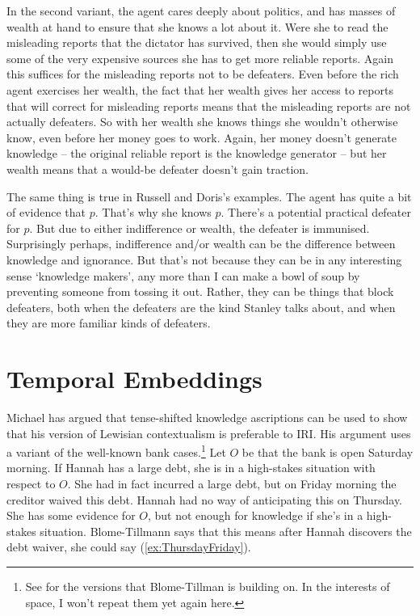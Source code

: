 \documentclass[11pt,oneside]{book}
\begin{document}
In the second variant, the agent cares deeply about politics, and has masses of wealth at hand to ensure that she knows a lot about it. Were she to read the misleading reports that the dictator has survived, then she would simply use some of the very expensive sources she has to get more reliable reports. Again this suffices for the misleading reports not to be defeaters. Even before the rich agent exercises her wealth, the fact that her wealth gives her access to reports that will correct for misleading reports means that the misleading reports are not actually defeaters. So with her wealth she knows things she wouldn't otherwise know, even before her money goes to work. Again, her money doesn't generate knowledge -- the original reliable report is the knowledge generator -- but her wealth means that a would-be defeater doesn't gain traction.

The same thing is true in Russell and Doris's examples. The agent has quite a bit of evidence that \(p\). That's why she knows \(p\). There's a potential practical defeater for \(p\). But due to either indifference or wealth, the defeater is immunised. Surprisingly perhaps, indifference and/or wealth can be the difference between knowledge and ignorance. But that's not because they can be in any interesting sense `knowledge makers', any more than I can make a bowl of soup by preventing someone from tossing it out. Rather, they can be things that block defeaters, both when the defeaters are the kind Stanley talks about, and when they are more familiar kinds of defeaters.

\section{Temporal Embeddings}

Michael \cite{MBT2009} has argued that tense-shifted knowledge ascriptions can be used to show that his version of Lewisian contextualism is preferable to IRI. His argument uses a variant of the well-known bank cases.\footnote{See \cite{Stanley2005-STAKAP} for the versions that Blome-Tillman is building on. In the interests of space, I won't repeat them yet again here.} Let \(O\) be that the bank is open Saturday morning. If Hannah has a large debt, she is in a high-stakes situation with respect to \(O\). She had in fact incurred a large debt, but on Friday morning the creditor waived this debt. Hannah had no way of anticipating this on Thursday. She has some evidence for \(O\), but not enough for knowledge if she's in a high-stakes situation. Blome-Tillmann says that this means after Hannah discovers the debt waiver, she could say (\ref{ex:ThursdayFriday}).
\end{document}
